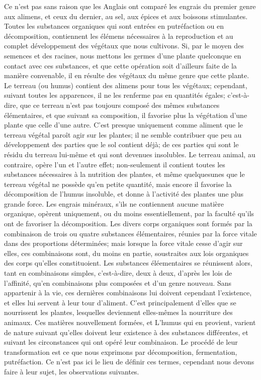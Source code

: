 Ce n'est pas sans raison que les Anglais\setcounter{page}{226} ont comparé les engrais du premier genre aux alimens, et ceux du dernier, au sel, aux épices et aux boissons stimulantes. Toutes les substances organiques qui sont entrées en putréfaction ou en décomposition, contiennent les élémens nécessaires à la reproduction et au complet développement des végétaux que nous cultivons. Si, par le moyen des semences et des racines, nous mettons les germes d'une plante quelconque en contact avec ces substances, et que cette opération soit d'ailleurs faite de la manière convenable, il en résulte des végétaux du même genre que cette plante. Le terreau (ou humus) contient des alimens pour tous les végétaux; cependant, suivant toutes les apparences, il ne les renferme pas en quantités égales; c'est-à-dire, que ce terreau n'est pas toujours composé des mêmes substances élémentaires, et que suivant sa composition, il favorise plus la végétation d'une plante que celle d'une autre. C'est presque uniquement comme aliment que le terreau végétal paroît agir sur les plantes; il ne semble contribuer que peu au développement des parties que le sol contient déjà; de ces parties qui sont le résidu du terreau lui-même et qui sont devenues insolubles. Le terreau animal, au contraire, opère l'un et l'autre effet; non-seulement il\setcounter{page}{227} contient toutes les substances nécessaires à la nutrition des plantes, et même quelquesunes que le terreau végétal ne possède qu’en petite quantité, mais encore il favorise la décomposition de l’humus insoluble, et donne à l’activité des plantes une plus grande force.
Les engrais minéraux, s’ils ne contiennent aucune matière organique, opèrent uniquement, ou du moins essentiellement, par la faculté qu’ils ont de favoriser la décomposition.
Les divers corps organiques sont formés par la combinaison de trois ou quatre substances élémentaires, réunies par la force vitale dans des proportions déterminées; mais lorsque la force vitale cesse d’agir sur elles, ces combinaisons sont, du moins en partie, soustraites aux lois organiques des corps qu’elles constituoient. Les substances éléementaires se réunissent alors, tant en combinaisons simples, c’est-à-dire, deux à deux, d’après
les lois de l’affinité, qu’en combinaisons plus composées et d’un genre nouveau. Sans appartenir à la vie, ces dernières combinaisons lui doivent cependant l’existence, et elles lui servent à leur tour d’aliment. C’est principalement d’elles que se nourrissent les plantes, lesquelles deviennent elles-mêmes la nourriture des animaux.
Ces matières nouvellement formées, et\setcounter{page}{228} L'humus qui en provient, varient de nature suivant qu'elles doivent leur existence à des substances différentes, et suivant les circonstances qui ont opéré leur combinaison. Le procédé de leur transformation est ce que nous exprimons par décomposition, fermentation, putréfaction. Ce n'est pas ici le lieu de définir ces termes, cependant nous devons faire à leur sujet, les observations suivantes.
